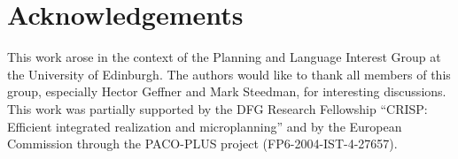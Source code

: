 \section*{Acknowledgements}

This work arose in the context of the Planning and Language Interest Group
at the University of Edinburgh. The authors would like to thank all members
of this group, especially Hector Geffner and Mark Steedman, for interesting
discussions. This work was partially supported by the DFG Research
Fellowship ``CRISP: Efficient integrated realization and microplanning''
and by the European Commission through the PACO-PLUS project
(FP6-2004-IST-4-27657).


